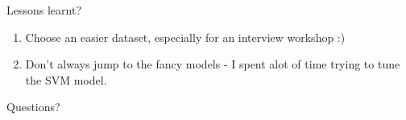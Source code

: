 \documentclass[ignorenonframetext,]{beamer}
\providecommand{\tightlist}{%
\setlength{\itemsep}{0pt}\setlength{\parskip}{0pt}}
\begin{document}
\begin{frame}{Lessons learnt?}

\begin{enumerate}
\def\labelenumi{\arabic{enumi}.}
\tightlist
\item
  Choose an easier dataset, especially for an interview workshop :)
\item
  Don't always jump to the fancy models - I spent alot of time trying to
  tune the SVM model.
\end{enumerate}

\end{frame}

\begin{frame}{Questions?}

\end{frame}
\end{document}
